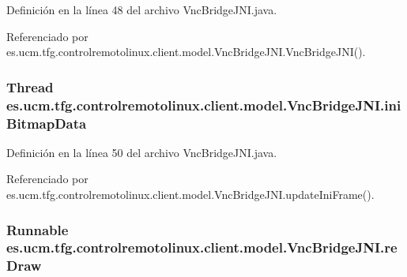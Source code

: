 Definición en la línea 48 del archivo Vnc\-Bridge\-J\-N\-I.\-java.



Referenciado por es.\-ucm.\-tfg.\-controlremotolinux.\-client.\-model.\-Vnc\-Bridge\-J\-N\-I.\-Vnc\-Bridge\-J\-N\-I().

\hypertarget{classes_1_1ucm_1_1tfg_1_1controlremotolinux_1_1client_1_1model_1_1VncBridgeJNI_ac4fac9c5083bbd152bebfa5b3c68baf5}{
\subsubsection[{ini\-Bitmap\-Data}]{\setlength{\rightskip}{0pt plus 5cm}Thread es.\-ucm.\-tfg.\-controlremotolinux.\-client.\-model.\-Vnc\-Bridge\-J\-N\-I.\-ini\-Bitmap\-Data\hspace{0.3cm}{\ttfamily [private]}}}\label{classes_1_1ucm_1_1tfg_1_1controlremotolinux_1_1client_1_1model_1_1VncBridgeJNI_ac4fac9c5083bbd152bebfa5b3c68baf5}


Definición en la línea 50 del archivo Vnc\-Bridge\-J\-N\-I.\-java.



Referenciado por es.\-ucm.\-tfg.\-controlremotolinux.\-client.\-model.\-Vnc\-Bridge\-J\-N\-I.\-update\-Ini\-Frame().

\hypertarget{classes_1_1ucm_1_1tfg_1_1controlremotolinux_1_1client_1_1model_1_1VncBridgeJNI_a69b941469d487a4e6e7ebd83a9091b26}{
\subsubsection[{re\-Draw}]{\setlength{\rightskip}{0pt plus 5cm}Runnable es.\-ucm.\-tfg.\-controlremotolinux.\-client.\-model.\-Vnc\-Bridge\-J\-N\-I.\-re\-Draw\hspace{0.3cm}{\ttfamily [private]}}}\label{classes_1_1ucm_1_1tfg_1_1controlremotolinux_1_1client_1_1model_1_1VncBridgeJNI_a69b941469d487a4e6e7ebd83a9091b26}


